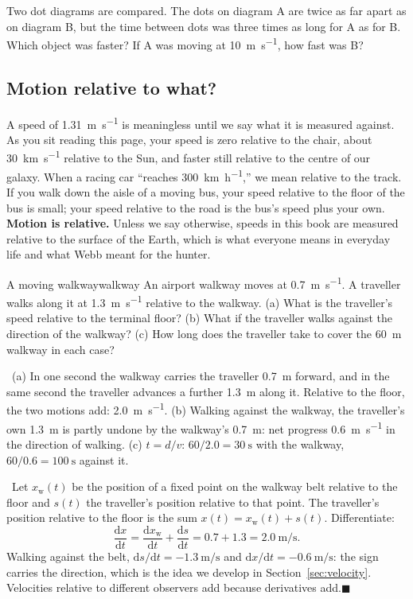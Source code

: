 \documentclass[11pt,twoside,openany]{book}
\newcommand{\dd}{\mathrm{d}}
\newcommand{\deriv}[2]{\frac{\dd #1}{\dd #2}}
\newcounter{check}[chapter]
\newcommand{\viewtag}[3]{\fcolorbox{#2}{#3}{\footnotesize\textbf{\textcolor{#2}{#1}}}}
\newcommand{\elemtag}{\viewtag{Elementary}{elemcol}{elempale}}
\newcommand{\calctag}{\viewtag{Calculus}{calccol}{calcpale}}
\newcommand{\elem}{\par\medskip\noindent\elemtag\ }
\newcommand{\calc}{\par\medskip\noindent\calctag\ }
\newcommand{\qed}{\hfill$\blacksquare$}
\begin{document}
\begin{checkbox}
Two dot diagrams are compared. The dots on diagram A are twice as far apart as on diagram B, but the time between dots was three times as long for A as for B. Which object was faster? If A was moving at \SI{10}{\metre\per\second}, how fast was B?
\end{checkbox}

\subsection{Motion relative to what?}
\label{sec:relative}

A speed of \SI{1.31}{\metre\per\second} is meaningless until we say what it is measured against. As you sit reading this page, your speed is zero relative to the chair, about \SI{30}{\kilo\metre\per\second} relative to the Sun, and faster still relative to the centre of our galaxy. When a racing car ``reaches \SI{300}{\kilo\metre\per\hour},'' we mean relative to the track. If you walk down the aisle of a moving bus, your speed relative to the floor of the bus is small; your speed relative to the road is the bus's speed plus your own. \textbf{Motion is relative.} Unless we say otherwise, speeds in this book are measured relative to the surface of the Earth, which is what everyone means in everyday life and what Webb meant for the hunter.

\begin{example}{A moving walkway}{walkway}
An airport walkway moves at \SI{0.7}{\metre\per\second}. A traveller walks along it at \SI{1.3}{\metre\per\second} relative to the walkway. (a) What is the traveller's speed relative to the terminal floor? (b) What if the traveller walks against the direction of the walkway? (c) How long does the traveller take to cover the \SI{60}{\metre} walkway in each case?

\elem (a) In one second the walkway carries the traveller \SI{0.7}{\metre} forward, and in the same second the traveller advances a further \SI{1.3}{\metre} along it. Relative to the floor, the two motions add: \SI{2.0}{\metre\per\second}. (b) Walking against the walkway, the traveller's own \SI{1.3}{\metre} is partly undone by the walkway's \SI{0.7}{\metre}: net progress \SI{0.6}{\metre\per\second} in the direction of walking. (c) $t = d/v$: $60/2.0 = \SI{30}{\second}$ with the walkway, $60/0.6 = \SI{100}{\second}$ against it.

\calc Let $x_{\text{w}}(t)$ be the position of a fixed point on the walkway belt relative to the floor and $s(t)$ the traveller's position relative to that point. The traveller's position relative to the floor is the sum $x(t) = x_{\text{w}}(t) + s(t)$. Differentiate:
\[
\deriv{x}{t} = \deriv{x_{\text{w}}}{t} + \deriv{s}{t} = 0.7 + 1.3 = \SI{2.0}{\metre\per\second}.
\]
Walking against the belt, $\dd s/\dd t = \SI{-1.3}{\metre\per\second}$ and $\dd x/\dd t = \SI{-0.6}{\metre\per\second}$: the sign carries the direction, which is the idea we develop in Section~\ref{sec:velocity}. Velocities relative to different observers add because derivatives add.\qed
\end{example}
\end{document}
